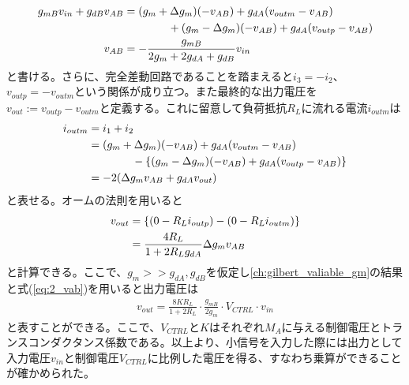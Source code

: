             \begin{align}
                g_{mB}v_{in}+g_{dB}v_{AB}&=(g_{m}+\Delta g_{m})(-v_{AB})+g_{dA}(v_{outm}-v_{AB})    \notag\\
                &\quad\quad\quad\quad +(g_{m}-\Delta g_{m})(-v_{AB})+g_{dA}(v_{outp}-v_{AB})     \notag\\
                v_{AB}&=-\frac{g_{mB}}{2g_{m}+2g_{dA}+g_{dB}}v_{in}     \label{eq:2_vab}
            \end{align}
            と書ける。さらに、完全差動回路であることを踏まえると$i_{3}=-i_{2}$、$v_{outp}=-v_{outm}$という関係が成り立つ。また最終的な出力電圧を$v_{out}:=v_{outp}-v_{outm}$と定義する。これに留意して負荷抵抗$R_{L}$に流れる電流$i_{outm}$は
            \begin{align}
                i_{outm}&=i_{1}+i_{2}       \notag\\
                &=(g_{m}+\Delta g_{m})(-v_{AB})+g_{dA}(v_{outm}-v_{AB})       \notag\\
                &\quad\quad\quad\quad -\left\{  (g_{m}-\Delta g_{m})(-v_{AB})+g_{dA}(v_{outp}-v_{AB})  \right\}   \notag\\
                &=-2(\Delta g_{m}v_{AB}+g_{dA}v_{out})      \label{eq:2_iout}
            \end{align}
            と表せる。オームの法則を用いると
            \begin{align}
                v_{out}&=\left\{ \left(0-R_{L}i_{outp}\right) - \left(0-R_{L}i_{outm}\right) \right\}    \notag\\
                &=\frac{ 4R_{L} }{1+2R_{L}g_{dA}}\Delta g_{m}v_{AB}     \notag
            \end{align}
            と計算できる。ここで、$g_{m}>>g_{dA},g_{dB}$を仮定し\ref{ch:gilbert_valiable_gm}の結果と式(\ref{eq:2_vab})を用いると出力電圧は
            \begin{align}
                v_{out}=\frac{ 8KR_{L} }{ 1+2R_{L} }\cdot\frac{ g_{mB} }{ 2g_{m} }\cdot V_{CTRL}\cdot v_{in}       \label{eq:2_vout}
            \end{align}
            と表すことができる。ここで、$V_{CTRL}$と$K$はそれぞれ$M_{A}$に与える制御電圧とトランスコンダクタンス係数である。以上より、小信号を入力した際には出力として入力電圧$v_{in}$と制御電圧$V_{CTRL}$に比例した電圧を得る、すなわち乗算ができることが確かめられた。
            \newpage


